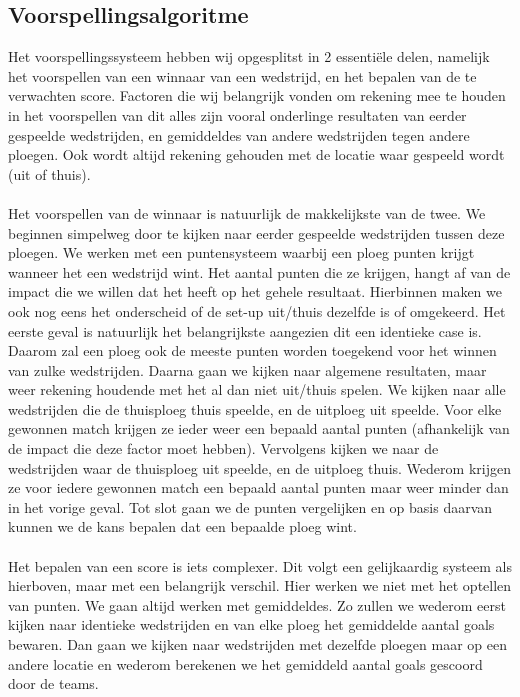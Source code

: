 \documentclass[11pt, a4paper]{article}
\begin{document}
\subsection{Voorspellingsalgoritme}
Het voorspellingssysteem hebben wij opgesplitst in 2 essenti\"ele delen, namelijk het voorspellen van een winnaar van een wedstrijd, en het bepalen van de te verwachten score. Factoren die wij belangrijk vonden om rekening mee te houden in het voorspellen van dit alles zijn vooral onderlinge resultaten van eerder gespeelde wedstrijden, en gemiddeldes van andere wedstrijden tegen andere ploegen. Ook wordt altijd rekening gehouden met de locatie waar gespeeld wordt (uit of thuis).
\\
\\
Het voorspellen van de winnaar is natuurlijk de makkelijkste van de twee. We beginnen simpelweg door te kijken naar eerder gespeelde wedstrijden tussen deze ploegen. We werken met een puntensysteem waarbij een ploeg punten krijgt wanneer het een wedstrijd wint. Het aantal punten die ze krijgen, hangt af van de impact die we willen dat het heeft op het gehele resultaat. Hierbinnen maken we ook nog eens het onderscheid of de set-up uit/thuis dezelfde is of omgekeerd. Het eerste geval is natuurlijk het belangrijkste aangezien dit een identieke case is. Daarom zal een ploeg ook de meeste punten worden toegekend voor het winnen van zulke wedstrijden.
Daarna gaan we kijken naar algemene resultaten, maar weer rekening houdende met het al dan niet uit/thuis spelen. We kijken naar alle wedstrijden die de thuisploeg thuis speelde, en de uitploeg uit speelde. Voor elke gewonnen match krijgen ze ieder weer een bepaald aantal punten (afhankelijk van de impact die deze factor moet hebben). Vervolgens kijken we naar de wedstrijden waar de thuisploeg uit speelde, en de uitploeg thuis. Wederom krijgen ze voor iedere gewonnen match een bepaald aantal punten maar weer minder dan in het vorige geval. Tot slot gaan we de punten vergelijken en op basis daarvan kunnen we de kans bepalen dat een bepaalde ploeg wint.
\\
\\
Het bepalen van een score is iets complexer. Dit volgt een gelijkaardig systeem als hierboven, maar met een belangrijk verschil. Hier werken we niet met het optellen van punten. We gaan altijd werken met gemiddeldes. Zo zullen we wederom eerst kijken naar identieke wedstrijden en van elke ploeg het gemiddelde aantal goals bewaren. Dan gaan we kijken naar wedstrijden met dezelfde ploegen maar op een andere locatie en wederom berekenen we het gemiddeld aantal goals gescoord door de teams.
\end{document}
